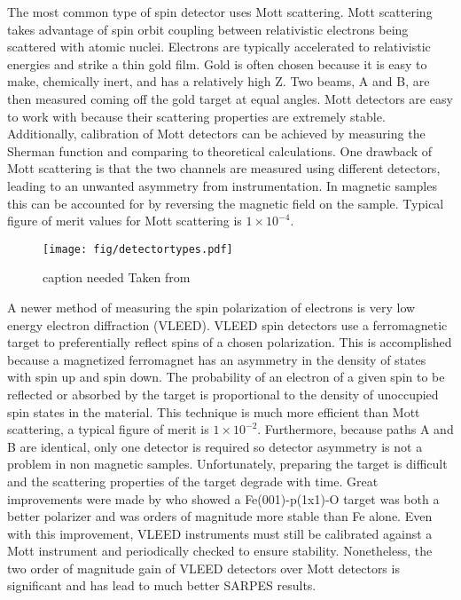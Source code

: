 \documentclass[12pt]{article}
\begin{document}
The most common type of spin detector uses Mott scattering.
Mott scattering takes advantage of spin orbit coupling between relativistic electrons being scattered with atomic nuclei.
Electrons are typically accelerated to relativistic energies and strike a thin gold film.
Gold is often chosen because it is easy to make, chemically inert, and has a relatively high Z.
Two beams, A and B, are then measured coming off the gold target at equal angles\cite{Hoesch}.
Mott detectors are easy to work with because their scattering properties are extremely stable.
Additionally, calibration of Mott detectors can be achieved by measuring the Sherman function and comparing to theoretical calculations.
One drawback of Mott scattering is that the two channels are measured using different detectors, leading to an unwanted asymmetry from instrumentation\cite{Okuda-Kimura}.
In magnetic samples this can be accounted for by reversing the magnetic field on the sample.
Typical figure of merit values for Mott scattering is $1\times10^{-4}$.

\begin{figure}[h]
  \centering
  \texttt{[image: fig/detectortypes.pdf]}
  \caption[should I put this here?]
  {caption needed Taken from \cite{Okuda-Kimura}}
  \label{fig:asymmetry}
\end{figure}

A newer method of measuring the spin polarization of electrons is very low energy electron diffraction (VLEED).
VLEED spin detectors use a ferromagnetic target to preferentially reflect spins of a chosen polarization.
This is accomplished because a magnetized ferromagnet has an asymmetry in the density of states with spin up and spin down.
The probability of an electron of a given spin to be reflected or absorbed by the target is proportional to the density of unoccupied spin states in the material\cite{Okuda-Kimura}.
This technique is much more efficient than Mott scattering, a typical figure of merit is $1\times10^{-2}$.
Furthermore, because paths A and B are identical, only one detector is required so detector asymmetry is not a problem in non magnetic samples.
Unfortunately, preparing the target is difficult and the scattering properties of the target degrade with time.
Great improvements were made by \cite{Bertacco} who showed a Fe(001)-p(1x1)-O target was both a better polarizer and was orders of magnitude more stable than Fe alone.
Even with this improvement, VLEED instruments must still be calibrated against a Mott instrument and periodically checked to ensure stability.
Nonetheless, the two order of magnitude gain of VLEED detectors over Mott detectors is significant and has lead to much better SARPES results.
\end{document}
